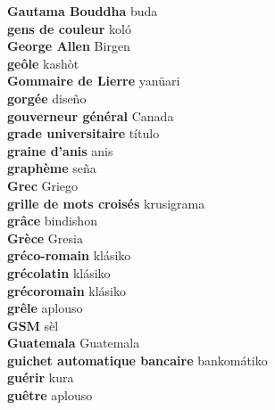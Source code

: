 \textbf{ Gautama Bouddha  } buda \\
\textbf{ gens de couleur  } koló \\
\textbf{ George Allen  } Birgen \\
\textbf{ geôle  } kashòt \\
\textbf{ Gommaire de Lierre  } yanüari \\
\textbf{ gorgée  } diseño \\
\textbf{ gouverneur général  } Canada \\
\textbf{ grade universitaire  } título \\
\textbf{ graine d’anis  } anis \\
\textbf{ graphème  } seña \\
\textbf{ Grec  } Griego \\
\textbf{ grille de mots croisés  } krusigrama \\
\textbf{ grâce  } bindishon \\
\textbf{ Grèce  } Gresia \\
\textbf{ gréco-romain  } klásiko \\
\textbf{ grécolatin  } klásiko \\
\textbf{ grécoromain  } klásiko \\
\textbf{ grêle  } aplouso \\
\textbf{ GSM  } sèl \\
\textbf{ Guatemala  } Guatemala \\
\textbf{ guichet automatique bancaire  } bankomátiko \\
\textbf{ guérir  } kura \\
\textbf{ guêtre  } aplouso \\
